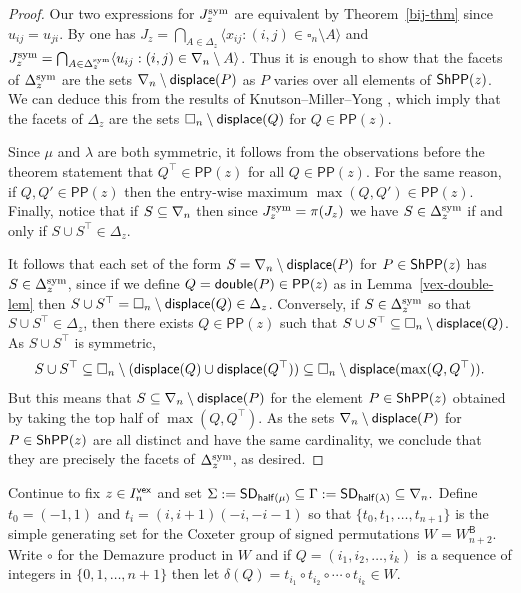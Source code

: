 \documentclass[10pt]{article}
\begin{document}
\begin{proof}
Our two expressions for $J^{\mathrm{sym}}_z$ are equivalent by Theorem~\ref{bij-thm} since $u_{ij}=u_{ji}$.
By \cite[Thm.~1.7]{MS} one has $J_z = \bigcap_{A \in \Delta_z} \langle x_{ij} :  (i,j) \in \square_n\setminus A\rangle$ and
$J^{\mathrm{sym}}_z = \bigcap_{A \in \Delta^{\mathrm{sym}}_z} \langle u_{ij} :  (i,j) \in \nabla_n\setminus A\rangle$.
Thus it is enough to show that the facets of $\Delta^{\mathrm{sym}}_z$ are the sets $\nabla_n\setminus \mathsf{displace}(P)$ as  $P$ varies over all elements of $\mathsf{ShPP}(z)$.
 We can deduce this from the results of Knutson--Miller--Yong \cite[Thms.~4.4 and 5.8]{KnutsonMillerYong}, which imply that the facets of     $\Delta_z$ are the sets $\square_n\setminus \mathsf{displace}(Q)$ for $Q \in \mathsf{PP}(z)$.
 
 

Since $\mu$ and $\lambda$ are both symmetric,
it follows from the observations before the theorem statement that  $Q^\top \in \mathsf{PP}(z)$ for all $Q \in \mathsf{PP}(z)$.
 For the same reason, if $Q,Q' \in \mathsf{PP}(z)$ then the entry-wise maximum
 $\max(Q,Q')\in\mathsf{PP}(z)$.
 Finally, notice that if $S \subseteq \nabla_n$ then 
 since $J^{\mathrm{sym}}_z = \pi(J_z)$ 
 we have $S \in\Delta^{\mathrm{sym}}_z$ if and only if $S\cup S^\top \in \Delta_z$.

It follows that each set of the form $S = \nabla_n\setminus \mathsf{displace}(P) $
for $P \in \mathsf{ShPP}(z)$ has $ S \in \Delta^{\mathrm{sym}}_z$, since 
if we define $Q = \mathsf{double}(P)\in \mathsf{PP}(z)$  as in Lemma~\ref{vex-double-lem} then
$S\cup S^\top = \square_n\setminus \mathsf{displace}(Q) \in \Delta_z$.
Conversely, if $S \in\Delta^{\mathrm{sym}}_z$ so that $S\cup S^\top \in \Delta_z$,
 then there exists $Q \in \mathsf{PP}(z)$ such that $S\cup S^\top  \subseteq \square_n \setminus \mathsf{displace}(Q)$. As $S\cup S^\top$ is symmetric,  
\[
 S\cup S^\top   \subseteq \square_n \setminus (\mathsf{displace}(Q)\cup \mathsf{displace}(Q^\top)) \subseteq \square_n \setminus \mathsf{displace}(\max(Q,Q^\top))
 .\]
But this  means that $S\subseteq \nabla_n \setminus \mathsf{displace}(P)$
 for the element $P \in \mathsf{ShPP}(z)$ obtained by taking the top half of $\max(Q,Q^\top)$.
 As the sets  $\nabla_n\setminus \mathsf{displace}(P) $
for $P \in \mathsf{ShPP}(z)$ are all distinct and have the same cardinality,
we conclude that they are precisely
 the facets of $\Delta^{\mathrm{sym}}_z$, as desired.
\end{proof}

 
Continue to fix $z \in I^{\mathsf{vex}}_n$ and set 
$ \Sigma := \mathsf{SD}_{\mathsf{half}(\mu)}\subseteq \Gamma := \mathsf{SD}_{\mathsf{half}(\lambda)}\subseteq \nabla_n.$
Define $t_0 = (-1,1)$ and $t_i = (i,i+1)(-i,-i-1)$ so that $\{t_0,t_1,\dots,t_{n+1}\}$ is the simple generating set for the Coxeter group of signed permutations $W=W^{\mathsf{B}}_{n+2}$. Write $\circ$ for the Demazure product in $W$ and if $Q=(i_1,i_2,\dots,i_k)$ is a sequence of integers in $\{0,1,\dots,n+1\}$ then let $\delta(Q) = t_{i_1}\circ t_{i_2}\circ \cdots \circ t_{i_k} \in W$.
\end{document}
